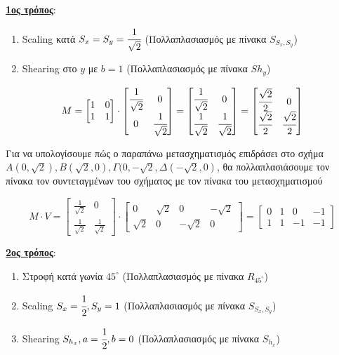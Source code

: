 \begin{solution}

\textbf{\underline{1ος τρόπος}}: 

\begin{enumerate}
	  \item Scaling κατά $S_x = S_y = \cfrac{1}{\sqrt{2}}$ (Πολλαπλασιασμός με πίνακα $S_{S_x, S_y}$)
	  \item Shearing στο $y$ με $b=1$ (Πολλαπλασιασμός με πίνακα $Sh_y$)
\end{enumerate}

\[
	M = 
		\begin{bmatrix}
			1 & 0 \\
			1 & 1
		\end{bmatrix}
	\cdot
		\begin{bmatrix}
			\cfrac{1}{\sqrt{2}} & 0 \\
			0 & \cfrac{1}{\sqrt{2}}
		\end{bmatrix}
	=	
		\begin{bmatrix}
			\cfrac{1}{\sqrt{2}} & 0 \\
			 \cfrac{1}{\sqrt{2}} & \cfrac{1}{\sqrt{2}}
		\end{bmatrix}
	=
	\begin{bmatrix}
			\cfrac{\sqrt{2}}{2} & 0 \\
			 \cfrac{\sqrt{2}}{2} & \cfrac{\sqrt{2}}{2}
		\end{bmatrix}	
\]

Για να υπολογίσουμε πώς ο παραπάνω μετασχηματισμός επιδράσει στο σχήμα $A (0, \sqrt{2}), B(\sqrt{2},0), \Gamma (0, -\sqrt{2}, \Delta(-\sqrt{2},0)$, θα πολλαπλασιάσουμε τον πίνακα τον συντεταγμένων του σχήματος με τον πίνακα του μετασχηματισμού

\[
M \cdot V = 
	\begin{bmatrix}
		\frac{1}{\sqrt{2}} & 0 \\
		\frac{1}{\sqrt{2}} & \frac{1}{\sqrt{2}} 
	\end{bmatrix}
\cdot 
	\begin{bmatrix}
		0 & \sqrt{2} & 0 & -\sqrt{2} \\
		\sqrt{2} & 0 & -\sqrt{2} & 0 
	\end{bmatrix}
	=
	\begin{bmatrix}
		0 & 1 & 0 & -1 \\
		1 & 1 & -1 & -1
	\end{bmatrix}	
\]


\textbf{\underline{2ος τρόπος}}: 

\begin{enumerate}
	  \item Στροφή κατά γωνία $45^\circ$ (Πολλαπλασιασμός με πίνακα $R_{45^\circ}$)
	  \item Scaling $S_x = \cfrac{1}{2}, S_y  = 1$ (Πολλαπλασιασμός με πίνακα $S_{S_x, S_y}$)
	  \item Shearing $S_{h_x}, a = \cfrac{1}{2}, b=0$ (Πολλαπλασιασμός με πίνακα $S_{h_x}$) 
\end{enumerate}


\end{solution}
